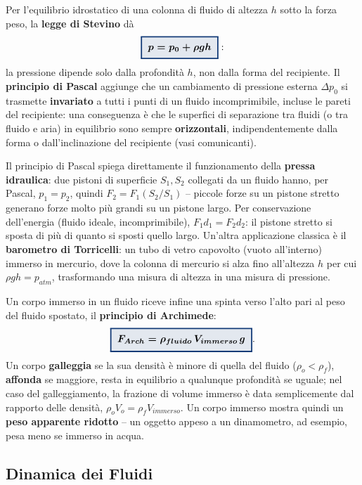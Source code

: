 \documentclass[a4paper,11pt]{article}
\newcommand{\keyeq}[1]{{\setlength{\fboxsep}{6pt}\setlength{\fboxrule}{1.3pt}\fcolorbox{chapblue}{chapblue!12}{\boldmath$\displaystyle #1$}}}
\begin{document}
Per l'equilibrio idrostatico di una colonna di fluido di altezza $h$ sotto la forza peso, la \textbf{legge di Stevino} dà
\[
\keyeq{p = p_0 + \rho g h}:
\]
la pressione dipende solo dalla profondità $h$, non dalla forma del recipiente. Il \textbf{principio di Pascal} aggiunge che un cambiamento di pressione esterna $\Delta p_0$ si trasmette \textbf{invariato} a tutti i punti di un fluido incomprimibile, incluse le pareti del recipiente: una conseguenza è che le superfici di separazione tra fluidi (o tra fluido e aria) in equilibrio sono sempre \textbf{orizzontali}, indipendentemente dalla forma o dall'inclinazione del recipiente (vasi comunicanti).

Il principio di Pascal spiega direttamente il funzionamento della \textbf{pressa idraulica}: due pistoni di superficie $S_1,S_2$ collegati da un fluido hanno, per Pascal, $p_1=p_2$, quindi $F_2=F_1(S_2/S_1)$ -- piccole forze su un pistone stretto generano forze molto più grandi su un pistone largo. Per conservazione dell'energia (fluido ideale, incomprimibile), $F_1d_1=F_2d_2$: il pistone stretto si sposta di più di quanto si sposti quello largo. Un'altra applicazione classica è il \textbf{barometro di Torricelli}: un tubo di vetro capovolto (vuoto all'interno) immerso in mercurio, dove la colonna di mercurio si alza fino all'altezza $h$ per cui $\rho gh=p_{atm}$, trasformando una misura di altezza in una misura di pressione.

Un corpo immerso in un fluido riceve infine una spinta verso l'alto pari al peso del fluido spostato, il \textbf{principio di Archimede}:
\[
\keyeq{F_{Arch} = \rho_{fluido}\,V_{immerso}\,g}.
\]
Un corpo \textbf{galleggia} se la sua densità è minore di quella del fluido ($\rho_o<\rho_f$), \textbf{affonda} se maggiore, resta in equilibrio a qualunque profondità se uguale; nel caso del galleggiamento, la frazione di volume immerso è data semplicemente dal rapporto delle densità, $\rho_o V_o = \rho_f V_{immerso}$. Un corpo immerso mostra quindi un \textbf{peso apparente ridotto} -- un oggetto appeso a un dinamometro, ad esempio, pesa meno se immerso in acqua.

\subsection{Dinamica dei Fluidi}
\end{document}
